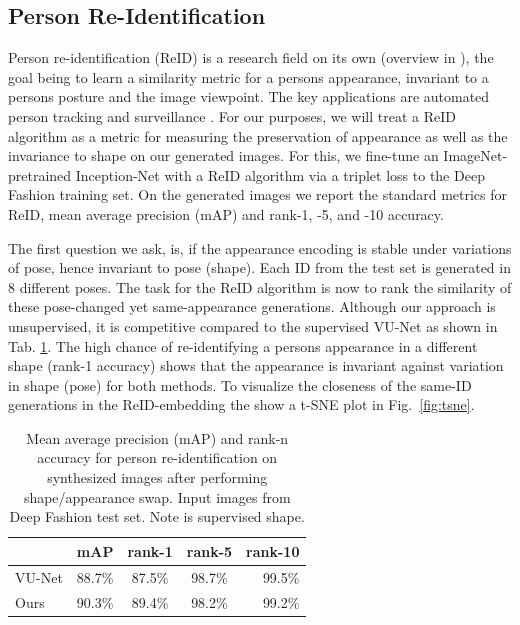 	\subsection{Person Re-Identification}
		Person re-identification (ReID) is a research field on its own (overview in \eg \cite{almazan18reidtowards, bedagkar14reidtrends}), the goal being to learn a similarity metric for a persons appearance, invariant to a persons posture and the image viewpoint.
		The key applications are automated person tracking and surveillance \cite{zheng16reidfuture}.
		For our purposes, we will treat a ReID algorithm as a metric for measuring the preservation of appearance as well as the invariance to shape on our generated images.
		For this, we fine-tune an ImageNet-pretrained \cite{russakovsky15imagenet} Inception-Net \cite{szegedy15inception} with a ReID algorithm \cite{xiao17reidjoint} via a triplet loss \cite{hermans17reidtriplet} to the Deep Fashion training set.
		On the generated images we report the standard metrics for ReID, mean average precision (mAP) and rank-1, -5, and -10 accuracy.


		The first question we ask, is, if the appearance encoding is stable under variations of pose, hence invariant to pose (shape). Each ID from the test set is generated in 8 different poses. The task for the ReID algorithm is now to rank the similarity of these pose-changed yet same-appearance generations.
		Although our approach is unsupervised, it is competitive compared to the supervised VU-Net \cite{esser18} as shown in Tab. \ref{tab:reid}. The high chance of re-identifying a persons appearance in a different shape (rank-1 accuracy) shows that the appearance is invariant against variation in shape (pose) for both methods.
 		To visualize the closeness of the same-ID generations in the ReID-embedding the show a t-SNE plot in Fig.~\ref{fig:tsne}.

		\begin{table}[htp]
			\centering
			\caption{Mean average precision (mAP) and rank-n accuracy for person re-identification on synthesized images after performing shape/appearance swap. Input images from Deep Fashion test set. Note \cite{esser18} is supervised \wrt shape.}
			\label{tab:reid}
			\begin{tabular}{l|cccr}
				\hline
				& mAP & rank-1 & rank-5 & rank-10 \\ \hline
				VU-Net \cite{esser18} & 88.7\% & 87.5\% & {98.7}\% & {99.5}\% \\
				Ours & {90.3}\% & {89.4}\% &{98.2}\% & {99.2}\% \\ \hline
			\end{tabular}
		\end{table}

